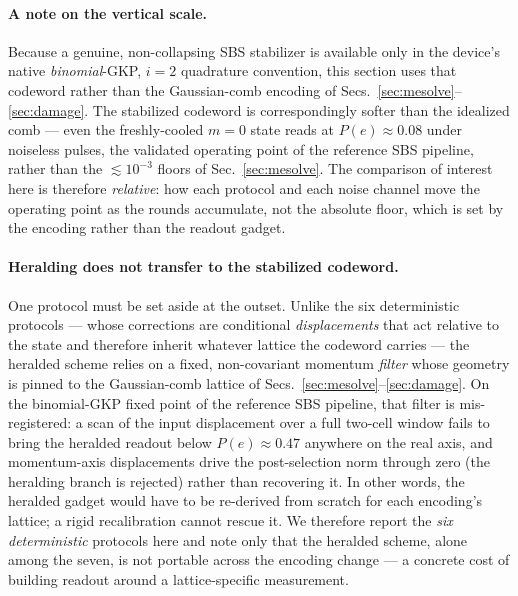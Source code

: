 \paragraph{A note on the vertical scale.} Because a genuine, non-collapsing SBS stabilizer is
available only in the device's native \emph{binomial}-GKP, $i=2$ quadrature convention, this
section uses that codeword rather than the Gaussian-comb encoding of
Secs.~\ref{sec:mesolve}--\ref{sec:damage}. The stabilized codeword is correspondingly softer than
the idealized comb --- even the freshly-cooled $m=0$ state reads at $P(e)\approx0.08$ under
noiseless pulses, the validated operating point of the reference SBS pipeline, rather than the
$\lesssim10^{-3}$ floors of Sec.~\ref{sec:mesolve}. The comparison of interest here is therefore
\emph{relative}: how each protocol and each noise channel move the operating point as the rounds
accumulate, not the absolute floor, which is set by the encoding rather than the readout gadget.

\paragraph{Heralding does not transfer to the stabilized codeword.} One protocol must be set
aside at the outset. Unlike the six deterministic protocols --- whose corrections are conditional
\emph{displacements} that act relative to the state and therefore inherit whatever lattice the
codeword carries --- the heralded scheme relies on a fixed, non-covariant momentum \emph{filter}
whose geometry is pinned to the Gaussian-comb lattice of Secs.~\ref{sec:mesolve}--\ref{sec:damage}.
On the binomial-GKP fixed point of the reference SBS pipeline, that filter is mis-registered: a
scan of the input displacement over a full two-cell window fails to bring the heralded readout below
$P(e)\approx0.47$ anywhere on the real axis, and momentum-axis displacements drive the
post-selection norm through zero (the heralding branch is rejected) rather than recovering it. In
other words, the heralded gadget would have to be re-derived from scratch for each encoding's
lattice; a rigid recalibration cannot rescue it. We therefore report the \emph{six deterministic}
protocols here and note only that the heralded scheme, alone among the seven, is not portable across
the encoding change --- a concrete cost of building readout around a lattice-specific measurement.

